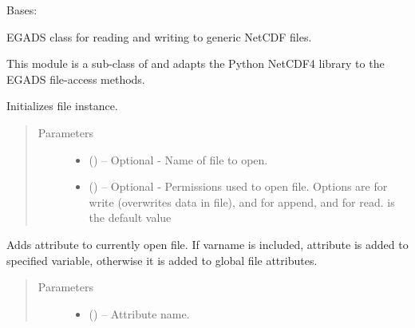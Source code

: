 \documentclass[a4paper,10pt,openany,english]{sphinxmanual}
\begin{document}
\label{egadsapi:module-egads.input.netcdf_io}

\begin{fulllineitems}
\label{egadsapi:egads.input.netcdf_io.NetCdf}
Bases: {\hyperref[egadsapi:egads.input.input_core.FileCore]{}}

EGADS class for reading and writing to generic NetCDF files.

This module is a sub-class of {\hyperref[egadsapi:egads.input.input_core.FileCore]{}} and adapts the Python NetCDF4
library to the EGADS file-access methods.

Initializes file instance.
\begin{quote}\begin{description}
\item[{Parameters}] \leavevmode\begin{itemize}
\item {} 
 () -- Optional -
Name of file to open.

\item {} 
 () -- Optional -
Permissions used to open file. Options are  for write (overwrites data in file),
 and  for append, and  for read.  is the default value

\end{itemize}

\end{description}\end{quote}

\begin{fulllineitems}
\label{egadsapi:egads.input.netcdf_io.NetCdf.add_attribute}
Adds attribute to currently open file. If varname is included, attribute
is added to specified variable, otherwise it is added to global file
attributes.
\begin{quote}\begin{description}
\item[{Parameters}] \leavevmode\begin{itemize}
\item {} 
 () -- Attribute name.


\end{itemize}
\end{description}
\end{quote}
\end{fulllineitems}
\end{fulllineitems}
\end{document}
